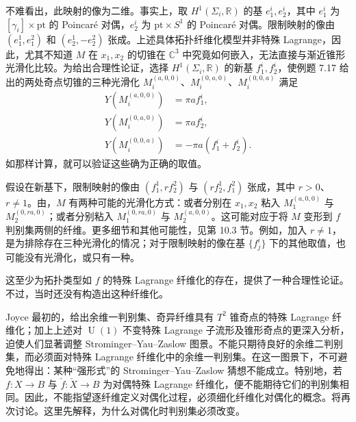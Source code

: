 不难看出，此映射的像为二维。事实上，取 $H^1(\Sigma_i,\mathbb R)$ 的基 $e_1^i,e_2^i$，其中 $e_1^i$ 为 $[\gamma_i]\times\mathrm{pt}$ 的 Poincaré 对偶，$e_2^i$ 为 $\mathrm{pt}\times S^1$ 的 Poincaré 对偶。限制映射的像由 $(e_1^1,e_1^2)$ 和 $(e_2^1,-e_2^2)$ 张成。上述具体拓扑纤维化模型并非特殊 Lagrange，因此，尤其不知道 $M$ 在 $x_1,x_2$ 的切锥在 $\mathbb C^3$ 中究竟如何嵌入，无法直接与渐近锥形光滑化比较。为给出合理性论证，选择 $H^1(\Sigma_i,\mathbb R)$ 的新基 $f_1^i,f_2^i$，使例题 7.17 给出的两处奇点切锥的三种光滑化 $M_i^{(a,0,0)}$、$M_i^{(0,a,0)}$、$M_i^{(0,0,a)}$ 满足
\[
\begin{aligned}
Y(M_i^{(a,0,0)})&=\pi af_1^i,\\
Y(M_i^{(0,a,0)})&=\pi af_2^i,\\
Y(M_i^{(0,0,a)})&=-\pi a(f_1^i+f_2^i).
\end{aligned}
\]
如那样计算，就可以验证这些确为正确的取值。

假设在新基下，限制映射的像由 $(f_1^1,rf_2^2)$ 与 $(rf_2^1,f_1^2)$ 张成，其中 $r>0$、$r\neq1$。由，$M$ 有两种可能的光滑化方式：或者分别在 $x_1,x_2$ 粘入 $M_1^{(a,0,0)}$ 与 $M_2^{(0,ra,0)}$；或者分别粘入 $M_1^{(0,ra,0)}$ 与 $M_2^{(a,0,0)}$。这可能对应于将 $M$ 变形到 $f$ 判别集两侧的纤维。更多细节和其他可能性，见第 10.3 节。例如，加入 $r\neq1$，是为排除存在三种光滑化的情况；对于限制映射的像在基 $\{f_j^i\}$ 下的其他取值，也可能没有光滑化，或只有一种。

这至少为拓扑类型如 $f$ 的特殊 Lagrange 纤维化的存在，提供了一种合理性论证。不过，当时还没有构造出这种纤维化。

Joyce 最初的，给出余维一判别集、奇异纤维具有 $T^2$ 锥奇点的特殊 Lagrange 纤维化；加上上述对 $\operatorname U(1)$ 不变特殊 Lagrange 子流形及锥形奇点的更深入分析，迫使人们显著调整 Strominger--Yau--Zaslow 图景。不能只期待良好的余维二判别集，而必须面对特殊 Lagrange 纤维化中的余维一判别集。在这一图景下，不可避免地得出：某种“强形式”的 Strominger--Yau--Zaslow 猜想不能成立。特别地，若 $f\colon X\to B$ 与 $\check f\colon\check X\to B$ 为对偶特殊 Lagrange 纤维化，便不能期待它们的判别集相同。因此，不能指望逐纤维定义对偶化过程，必须细化纤维化对偶化的概念。将再次讨论。这里先解释，为什么对偶化时判别集必须改变。

